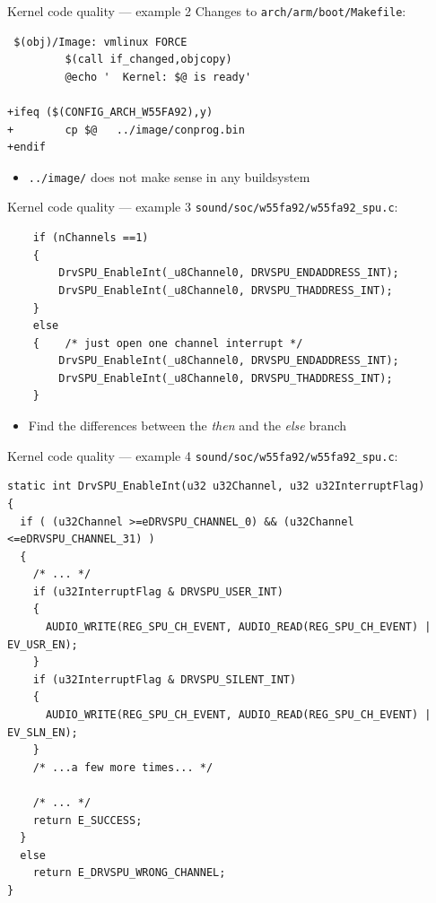 \documentclass[xetex,table]{beamer}
\begin{document}
\begin{frame}[fragile]{Kernel code quality --- example 2}
  Changes to \texttt{arch/arm/boot/Makefile}:

  \begin{verbatim}
 $(obj)/Image: vmlinux FORCE
         $(call if_changed,objcopy)
         @echo '  Kernel: $@ is ready'

+ifeq ($(CONFIG_ARCH_W55FA92),y)
+        cp $@   ../image/conprog.bin
+endif
  \end{verbatim}

  \begin{itemize}
  \item \texttt{../image/} does not make sense in any buildsystem
  \end{itemize}
\end{frame}

\begin{frame}[fragile]{Kernel code quality --- example 3}
  \texttt{sound/soc/w55fa92/w55fa92\_spu.c}:

  \begin{verbatim}
    if (nChannels ==1)
    {
        DrvSPU_EnableInt(_u8Channel0, DRVSPU_ENDADDRESS_INT);
        DrvSPU_EnableInt(_u8Channel0, DRVSPU_THADDRESS_INT);
    }
    else
    {    /* just open one channel interrupt */
        DrvSPU_EnableInt(_u8Channel0, DRVSPU_ENDADDRESS_INT);
        DrvSPU_EnableInt(_u8Channel0, DRVSPU_THADDRESS_INT);
    }
  \end{verbatim}

  \begin{itemize}
  \item Find the differences between the {\em then} and the {\em else} branch
  \end{itemize}
\end{frame}

\begin{frame}[fragile]{Kernel code quality --- example 4}
  \texttt{sound/soc/w55fa92/w55fa92\_spu.c}:

  \linespread{0.5}
  \begin{verbatim}
static int DrvSPU_EnableInt(u32 u32Channel, u32 u32InterruptFlag)
{
  if ( (u32Channel >=eDRVSPU_CHANNEL_0) && (u32Channel <=eDRVSPU_CHANNEL_31) )
  {
    /* ... */
    if (u32InterruptFlag & DRVSPU_USER_INT)
    {
      AUDIO_WRITE(REG_SPU_CH_EVENT, AUDIO_READ(REG_SPU_CH_EVENT) | EV_USR_EN);
    }
    if (u32InterruptFlag & DRVSPU_SILENT_INT)
    {
      AUDIO_WRITE(REG_SPU_CH_EVENT, AUDIO_READ(REG_SPU_CH_EVENT) | EV_SLN_EN);
    }
    /* ...a few more times... */

    /* ... */
    return E_SUCCESS;
  }
  else
    return E_DRVSPU_WRONG_CHANNEL;
}
  \end{verbatim}
\end{frame}
\end{document}
